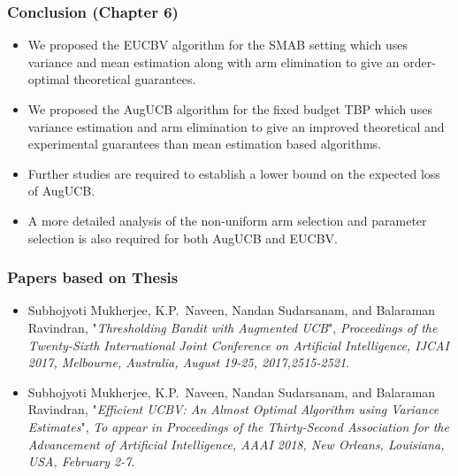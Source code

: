 \begin{frame}
\frametitle{Conclusion ({Chapter 6})}
\begin{itemize}
\item<1-> We proposed the EUCBV algorithm for the SMAB setting which uses variance and mean estimation along with arm elimination to give an order-optimal theoretical guarantees.
\item<2-> We proposed the AugUCB algorithm for the fixed budget TBP  which uses variance estimation and arm elimination to give an improved theoretical and experimental guarantees than mean estimation based algorithms.
\item<3-> Further studies are required to establish a lower bound on the expected loss of AugUCB.
\item<3-> A more detailed analysis of the non-uniform arm selection and parameter selection is also required for both AugUCB and EUCBV.
\end{itemize}
\end{frame}

\begin{frame}
\frametitle{Papers based on Thesis}
\begin{itemize}
\item Subhojyoti Mukherjee, K.P.~Naveen, Nandan Sudarsanam, and Balaraman Ravindran, "\textit{Thresholding Bandit with Augmented UCB}", {\em Proceedings of the Twenty-Sixth International Joint Conference on
               Artificial Intelligence, {IJCAI} 2017, Melbourne, Australia, August
               19-25, 2017,2515-2521}.
\item Subhojyoti Mukherjee, K.P.~Naveen, Nandan Sudarsanam, and Balaraman Ravindran, "\textit{Efficient UCBV: An Almost Optimal Algorithm using Variance Estimates}", {\em To appear in Proceedings of the Thirty-Second Association for the Advancement of Artificial Intelligence, {AAAI} 2018, New Orleans, Louisiana, USA, February 2-7}.
\end{itemize}
\end{frame}